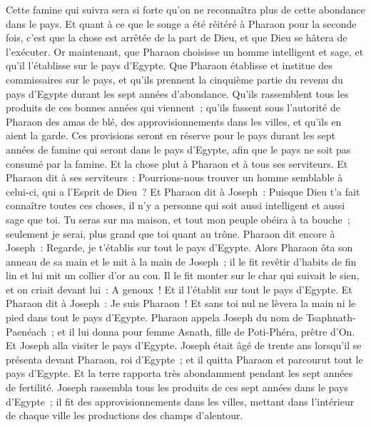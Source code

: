 \begin{multicols}{2}
Cette famine qui suivra sera si forte qu'on ne reconnaîtra plus de cette abondance dans le pays.
Et quant à ce que le songe a été réitéré à Pharaon pour la seconde fois, c'est que la chose est arrêtée de la part de Dieu, et que Dieu se hâtera de l'exécuter.
Or maintenant, que Pharaon choisisse un homme intelligent et sage, et qu'il l'établisse sur le pays d'Egypte.
Que Pharaon établisse et institue des commissaires sur le pays, et qu'ils prennent la cinquième partie du revenu du pays d'Egypte durant les sept années d'abondance.
Qu'ils rassemblent tous les produits de ces bonnes années qui viennent~; qu'ils fassent sous l'autorité de Pharaon des amas de blé, des approvisionnements dans les villes, et qu'ils en aient la garde.
Ces provisions seront en réserve pour le pays durant les sept années de famine qui seront dans le pays d'Egypte, afin que le pays ne soit pas consumé par la famine.
Et la chose plut à Pharaon et à tous ses serviteurs.
Et Pharaon dit à ses serviteurs~: Pourrions-nous trouver un homme semblable à celui-ci, qui a l'Esprit de Dieu~?
Et Pharaon dit à Joseph~: Puisque Dieu t'a fait connaître toutes ces choses, il n'y a personne qui soit aussi intelligent et aussi sage que toi.
Tu seras sur ma maison, et tout mon peuple obéira à ta bouche~; seulement je serai, plus grand que toi quant au trône.
Pharaon dit encore à Joseph~: Regarde, je t'établis sur tout le pays d'Egypte.
Alors Pharaon ôta son anneau de sa main et le mit à la main de Joseph~; il le fit revêtir d'habits de fin lin et lui mit un collier d'or au cou.
Il le fit monter sur le char qui suivait le sien, et on criait devant lui~: A genoux~! Et il l'établit sur tout le pays d'Egypte.
Et Pharaon dit à Joseph~: Je suis Pharaon~! Et sans toi nul ne lèvera la main ni le pied dans tout le pays d'Egypte.
Pharaon appela Joseph du nom de Tsaphnath-Paenéach~; et il lui donna pour femme Asnath, fille de Poti-Phéra, prêtre d'On. Et Joseph alla visiter le pays d'Egypte.
Joseph était âgé de trente ans lorsqu'il se présenta devant Pharaon, roi d'Egypte~; et il quitta Pharaon et parcourut tout le pays d'Egypte.
Et la terre rapporta très abondamment pendant les sept années de fertilité.
Joseph rassembla tous les produits de ces sept années dans le pays d'Egypte~; il fit des approvisionnements dans les villes, mettant dans l'intérieur de chaque ville les productions des champs d'alentour.

\end{multicols}
